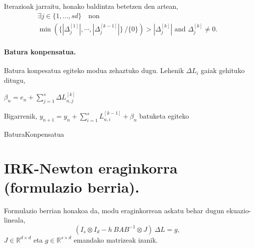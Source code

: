 Iterazioak jarraitu, honako baldintza betetzen den artean,
\begin{multline}
\label{eq:not_stopping Li}
\exists j \in \{1,\ldots,s d\} \quad \mbox{non} \quad \\
\min \left(\{|\Delta_j^{[1]}|,\cdots ,|\Delta_j^{[k-1]}|\} \ /\{0\} \right)>|\Delta_j^{[k]}| \mbox{ and } \Delta_j^{[k]} \neq 0. 
\end{multline}

\paragraph*{Batura konpensatua.}

Batura konpesatua egiteko modua zehaztuko dugu. Lehenik $\Delta L_i$ gaiak gehituko ditugu,
\begin{algorithm}[h]
$\beta_{n}={e}_{n} + \sum\limits_{j=1}^{s}\Delta L_{n,j}^{[k]}$\;
\end{algorithm}

Bigarrenik, $y_{n+1}=y_{n}+ \sum_{i=1}^{s} L_{n,i}^{[k-1]} + \beta_{n}$ batuketa egiteko

\begin{algorithm}[H]
  \SetAlgoLined\DontPrintSemicolon
  \caption{BaturaKonpensatua}
\end{algorithm} 


\section{IRK-Newton eraginkorra (formulazio berria).}


Formulazio berrian honakoa da, modu eraginkorrean askatu behar dugun ekuazio-lineala,
\begin{equation}
(I_s \otimes I_d - h \ BAB^{-1} \otimes J) \ \Delta L = g, 
\end{equation}
$J \in \mathbb{R}^{d \times d}$  eta $g \in \mathbb{R}^{s \times d}$ emandako matrizeak izanik. 


